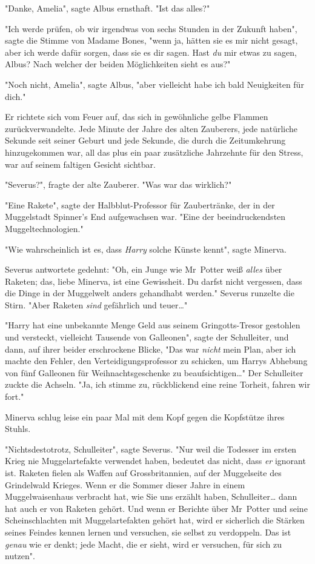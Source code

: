 {"Danke, Amelia", sagte Albus ernsthaft. "Ist das alles?"

"Ich werde prüfen, ob wir irgendwas von sechs Stunden in der Zukunft haben", sagte die Stimme von Madame Bones, "wenn ja, hätten sie es mir nicht gesagt, aber ich werde dafür sorgen, dass sie es dir sagen. Hast \emph{du} mir etwas zu sagen, Albus? Nach welcher der beiden Möglichkeiten sieht es aus?"

"Noch nicht, Amelia", sagte Albus, "aber vielleicht habe ich bald Neuigkeiten für dich."

Er richtete sich vom Feuer auf, das sich in gewöhnliche gelbe Flammen zurückverwandelte. Jede Minute der Jahre des alten Zauberers, jede natürliche Sekunde seit seiner Geburt und jede Sekunde, die durch die Zeitumkehrung hinzugekommen war, all das plus ein paar zusätzliche Jahrzehnte für den Stress, war auf seinem faltigen Gesicht sichtbar.

"Severus?", fragte der alte Zauberer. "Was war das wirklich?"

"Eine Rakete", sagte der Halbblut-Professor für Zaubertränke, der in der Muggelstadt Spinner's End aufgewachsen war. "Eine der beeindruckendsten Muggeltechnologien."

"Wie wahrscheinlich ist es, dass \emph{Harry} solche Künste kennt", sagte Minerva.

Severus antwortete gedehnt: "Oh, ein Junge wie Mr~Potter weiß \emph{alles} über Raketen; das, liebe Minerva, ist eine Gewissheit. Du darfst nicht vergessen, dass die Dinge in der Muggelwelt anders gehandhabt werden." Severus runzelte die Stirn. "Aber Raketen \emph{sind} gefährlich und teuer…"

"Harry hat eine unbekannte Menge Geld aus seinem Gringotts-Tresor gestohlen und versteckt, vielleicht Tausende von Galleonen", sagte der Schulleiter, und dann, auf ihrer beider erschrockene Blicke, "Das war \emph{nicht} mein Plan, aber ich machte den Fehler, den Verteidigungsprofessor zu schicken, um Harrys Abhebung von fünf Galleonen für Weihnachtsgeschenke zu beaufsichtigen…" Der Schulleiter zuckte die Achseln. "Ja, ich stimme zu, rückblickend eine reine Torheit, fahren wir fort."

Minerva schlug leise ein paar Mal mit dem Kopf gegen die Kopfstütze ihres Stuhls.

"Nichtsdestotrotz, Schulleiter", sagte Severus. "Nur weil die Todesser im ersten Krieg nie Muggelartefakte verwendet haben, bedeutet das nicht, dass \emph{er} ignorant ist. Raketen fielen als Waffen auf Grossbritannien, auf der Muggelseite des Grindelwald Krieges. Wenn er die Sommer dieser Jahre in einem Muggelwaisenhaus verbracht hat, wie Sie uns erzählt haben, Schulleiter… dann hat auch er von Raketen gehört. Und wenn er Berichte über Mr~Potter und seine Scheinschlachten mit Muggelartefakten gehört hat, wird er sicherlich die Stärken seines Feindes kennen lernen und versuchen, sie selbst zu verdoppeln. Das ist \emph{genau} wie er denkt; jede Macht, die er sieht, wird er versuchen, für sich zu nutzen".

}
